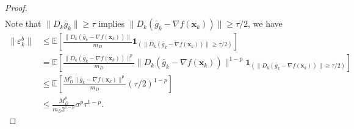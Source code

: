 \documentclass{article}
\newcommand{\bx}{\boldsymbol{x}}
\newcommand{\barg}{\bar{g}}
\theoremstyle{plain}
\theoremstyle{definition}
\theoremstyle{remark}
\begin{document}
\begin{proof}
\begin{align*}
\end{align*}
Note that $\|D_k\barg_k\|\geq \tau$ implies $\|D_k(\barg_k-\nabla f(\bx_k))\|\geq \tau/2$, we have
\begin{align*}
    \|\varepsilon_k^b\| & \leq \mathbb{E}\left[\frac{\|D_k(\barg_k-\nabla f(\bx_k))\|}{m_D}\boldsymbol{1}_{(\|D_k(\barg_k-\nabla f(\bx_k))\|\geq \tau/2)}\right] \\
    & =  \mathbb{E}\left[\frac{\|D_k(\barg_k-\nabla f(\bx_k))\|^p}{m_D}\|D_k(\barg_k-\nabla f(\bx_k))\|^{1-p}\boldsymbol{1}_{(\|D_k(\barg_k-\nabla f(\bx_k))\|\geq \tau/2)}\right] \\
    & \leq \mathbb{E}\left[\frac{M_D^p\|\barg_k-\nabla f(\bx_k)\|^p}{m_D}(\tau/2)^{1-p}\right] \\
    & \leq \frac{M_D^p}{m_D2^{1-p}}\sigma^p\tau^{1-p}.
\end{align*}



\end{proof}
\end{document}

